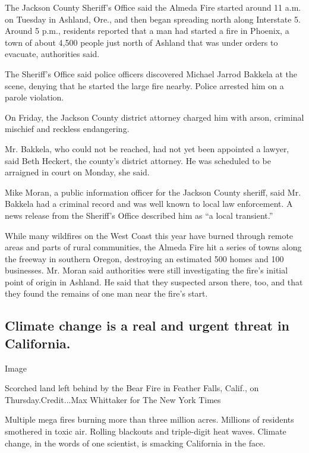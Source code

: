 The Jackson County Sheriff's Office said the Almeda Fire started around
11 a.m. on Tuesday in Ashland, Ore., and then began spreading north
along Interstate 5. Around 5 p.m., residents reported that a man had
started a fire in Phoenix, a town of about 4,500 people just north of
Ashland that was under orders to evacuate, authorities said.

The Sheriff's Office said police officers discovered Michael Jarrod
Bakkela at the scene, denying that he started the large fire nearby.
Police arrested him on a parole violation.

On Friday, the Jackson County district attorney charged him with arson,
criminal mischief and reckless endangering.

Mr. Bakkela, who could not be reached, had not yet been appointed a
lawyer, said Beth Heckert, the county's district attorney. He was
scheduled to be arraigned in court on Monday, she said.

Mike Moran, a public information officer for the Jackson County sheriff,
said Mr. Bakkela had a criminal record and was well known to local law
enforcement. A news release from the Sheriff's Office described him as
``a local transient.''

While many wildfires on the West Coast this year have burned through
remote areas and parts of rural communities, the Almeda Fire hit a
series of towns along the freeway in southern Oregon, destroying an
estimated 500 homes and 100 businesses. Mr. Moran said authorities were
still investigating the fire's initial point of origin in Ashland. He
said that they suspected arson there, too, and that they found the
remains of one man near the fire's start.

\hypertarget{climate-change-is-a-real-and-urgent-threat-in-california}{%
\subsection{Climate change is a real and urgent threat in
California.}\label{climate-change-is-a-real-and-urgent-threat-in-california}}

Image

Scorched land left behind by the Bear Fire in Feather Falls, Calif., on
Thursday.Credit...Max Whittaker for The New York Times

Multiple mega fires burning more than three million acres. Millions of
residents smothered in toxic air. Rolling blackouts and triple-digit
heat waves. Climate change, in the words of one scientist, is smacking
California in the face.

